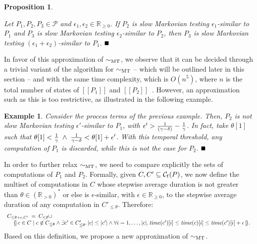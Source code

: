 \documentclass[copyright,creativecommons]{eptcs}
\newtheorem{new_example}
	[new_theorem]{Example}
\newtheorem{new_proposition}
	[new_theorem]{Proposition}
\newenvironment{example}
	{\begin{new_example}\rm}
	{\end{new_example}}
\newenvironment{proposition}
	{\begin{new_proposition}\rm}
	{\end{new_proposition}}
\def\ms#1{\null\ifmmode\mathord{\mathcode`-="702D\it #1\mathcode`\-="2200}\else$\mathord{\mathcode`-="702D\it #1\mathcode`\-="2200}$\fi}
\newcommand{\lsp}
	{[ \! [}
\newcommand{\rsp}
	{] \! ]}
\newcommand{\lmp}
	{\{ \! | \,}
\newcommand{\rmp}
	{\, | \! \}}
\newcommand{\calc}
        {\mathcal{C}}
\newcommand{\calp}
        {\mathcal{P}}
\newcommand{\realns}
	{\mathbb{R}}
\newcommand{\sbis}[1]
	{\sim_{#1}}
\newcommand{\fullbox}
	{{\mbox{}\nolinebreak\hfill{$\rule{2mm}{2mm}$}}}
\begin{document}
\begin{proposition}\label{time:transitivity}

Let $P_{1}, P_{2}, P_{3} \in \calp$ and $\epsilon_{1}, \epsilon_{2} \in \realns_{\ge 0}$. 
If $P_{2}$ is slow Markovian testing $\epsilon_{1}$-similar to $P_{1}$ and $P_{3}$ is slow Markovian testing 
$\epsilon_{2}$-similar to $P_{2}$, then $P_{3}$ is slow Markovian testing $(\epsilon_{1}\!+\!\epsilon_{2})$-similar to $P_{1}$.
\fullbox

\end{proposition}

\noindent In favor of this approximation of $\sbis{\rm MT}$, we observe that it can be decided through a trivial variant of the 
algorithm for $\sbis{\rm MT}$ -- which will be outlined later in this section -- and with the same time complexity, which is $O(n^5)$, 
where $n$ is the total number of states of $\lsp P_{1} \rsp$ and $\lsp P_{2} \rsp$~\cite{ABC}. 
However, an approximation such as this is too restrictive, as illustrated in the following example.

\begin{example}

Consider the process terms of the previous example. Then, $P_{2}$ is not slow Markovian testing $\epsilon'$-similar 
to $P_{1}$, with $\epsilon' > {1 \over(\gamma-\delta)} - {1 \over \gamma}$. In fact, take $\theta[1]$ 
such that $\theta[1] < {1 \over \gamma} \;\wedge\; {1 \over \gamma-\delta} < \theta[1] + \epsilon'$. 
With this temporal threshold, any computation of $P_{1}$ is discarded, while this is not the case for $P_{2}$.
\fullbox
\end{example}

In order to further relax $\sbis{\rm MT}$, we need to compare explicitly the sets of computations of $P_{1}$ and $P_{2}$. 
Formally, given $C, C' \subseteq \calc_{\rm f}(P)$, we now define the multiset of computations in $C$ whose stepwise average 
duration is not greater than $\theta \in (\realns_{> 0})^{*}$ or else is $\epsilon$-similar, with $\epsilon \in \realns_{\ge 0}$, 
to the stepwise average duration of any computation in $C'_{\le \theta}$. Therefore:
\[\begin{array}{l}
C_{\le \theta+\epsilon,C'} \: = \: C_{\le \theta} \cup \\
\hspace{4mm}
\lmp c \in C \mid c \not\in C_{\le \theta} \wedge 
\exists c' \in C'_{\le \theta} \ldotp |c| \le |c'| \land \forall i = 1, \dots, |c| \ldotp 
\ms{time}(c')[i] \le \ms{time}(c)[i] \le \ms{time}(c')[i]+\epsilon \rmp.
\end{array}\]
Based on this definition, we propose a new approximation of $\sbis{\rm MT}$.
\end{document}

